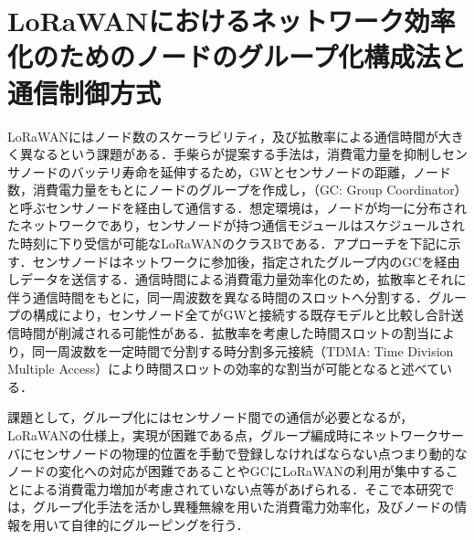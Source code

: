\section{LoRaWANにおけるネットワーク効率化のためのノードのグループ化構成法と通信制御方式}
LoRaWANにはノード数のスケーラビリティ，及び拡散率による通信時間が大きく異なるという課題がある．手柴らが提案する手法\cite{Obana2018}は，消費電力量を抑制しセンサノードのバッテリ寿命を延伸するため，GWとセンサノードの距離，ノード数，消費電力量をもとにノードのグループを作成し，（GC: Group Coordinator）と呼ぶセンサノードを経由して通信する．想定環境は，ノードが均一に分布されたネットワークであり，センサノードが持つ通信モジュールはスケジュールされた時刻に下り受信が可能なLoRaWANのクラスBである．アプローチを下記に示す．センサノードはネットワークに参加後，指定されたグループ内のGCを経由しデータを送信する．通信時間による消費電力量効率化のため，拡散率とそれに伴う通信時間をもとに，同一周波数を異なる時間のスロットへ分割する．グループの構成により，センサノード全てがGWと接続する既存モデルと比較し合計送信時間が削減される可能性がある．拡散率を考慮した時間スロットの割当により，同一周波数を一定時間で分割する時分割多元接続（TDMA: Time Division Multiple Access）により時間スロットの効率的な割当が可能となると述べている．

課題として，グループ化にはセンサノード間での通信が必要となるが，LoRaWANの仕様上，実現が困難である点，グループ編成時にネットワークサーバにセンサノードの物理的位置を手動で登録しなければならない点つまり動的なノードの変化への対応が困難であることやGCにLoRaWANの利用が集中することによる消費電力増加が考慮されていない点等があげられる．そこで本研究では，グループ化手法を活かし異種無線を用いた消費電力効率化，及びノードの情報を用いて自律的にグルーピングを行う．

